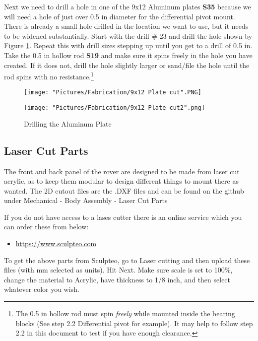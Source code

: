 \documentclass[12pt]{article}
\begin{document}
Next we need to drill a hole in one of the 9x12 Aluminum plates \textbf{S35} because we will need a hole of just over 0.5 in diameter for the differential pivot mount. There is already a small hole drilled in the location we want to use, but it needs to be widened substantially. Start with the drill \# 23 and drill the hole shown by Figure \ref{Drilling the Al plate}. Repeat this with drill sizes stepping up until you get to a drill of 0.5 in. Take the 0.5 in hollow rod \textbf{S19} and make sure it spins freely in the hole you have created. If it does not, drill the hole slightly larger or sand/file the hole until the rod spins with no resistance.\footnote{The 0.5 in hollow rod must spin \textit{freely} while mounted inside the bearing blocks (See step 2.2 Differential pivot for example). It may help to follow step 2.2 in this document to test if you have enough clearance.}

\begin{figure}[H]
  \centering
  \begin{minipage}[b]{0.45\textwidth}
    \texttt{[image: "Pictures/Fabrication/9x12 Plate cut".PNG]}
  \end{minipage}
  \hfill
  \begin{minipage}[b]{0.45\textwidth}
    \texttt{[image: "Pictures/Fabrication/9x12 Plate cut2".png]}
  \end{minipage}
  \caption{Drilling the Aluminum Plate}
  \label{Drilling the Al plate}
\end{figure}

\newpage
\subsection{Laser Cut Parts}

The front and back panel of the rover are designed to be made from laser cut acrylic, as to keep them modular to design different things to mount there as wanted. The 2D cutout files  are the .DXF files  and can be found on the github under Mechanical - Body Assembly - Laser Cut Parts

 \noindent If you do not have access to a lases cutter there is an online service which you can order these from below:

\begin{itemize}
	\item \href{https://www.sculpteo.com}{https://www.sculpteo.com}
\end{itemize}

To get the above parts from Sculpteo, go to Laser cutting and then upload these files (with mm selected as units). Hit Next. Make sure scale is set to 100\%, change the material to Acrylic, have thickness to 1/8 inch, and then select whatever color you wish.
\end{document}
